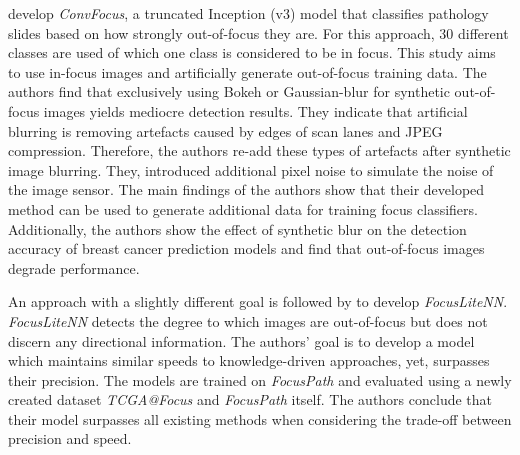 \textcite{kohlberger2019wholeslide} develop \emph{ConvFocus}, a truncated Inception (v3) model that classifies pathology slides based on how strongly out-of-focus they are. For this approach, 30 different classes are used of which one class is considered to be in focus. This study aims to use in-focus images and artificially generate out-of-focus training data.
The authors find that exclusively using Bokeh or Gaussian-blur for synthetic out-of-focus images yields mediocre detection results. They indicate that artificial blurring is removing artefacts caused by edges of scan lanes and JPEG compression. Therefore, the authors re-add these types of artefacts after synthetic image blurring. They, introduced additional pixel noise to simulate the noise of the image sensor.
The main findings of the authors show that their developed method can be used to generate additional data for training focus classifiers. Additionally, the authors show the effect of synthetic blur on the detection accuracy of breast cancer prediction models and find that out-of-focus images degrade performance.

An approach with a slightly different goal is followed by \textcite{wang2020focuslitenn} to develop \emph{FocusLiteNN}. \emph{FocusLiteNN} detects the degree to which images are out-of-focus but does not discern any directional information. The authors' goal is to develop a model which maintains similar speeds to knowledge-driven approaches, yet, surpasses their precision. The models are trained on \emph{FocusPath} \cite{hosseini2019encoding} and evaluated using a newly created dataset \emph{TCGA@Focus} and \emph{FocusPath} itself.
The authors conclude that their model surpasses all existing methods when considering the trade-off between precision and speed.  
